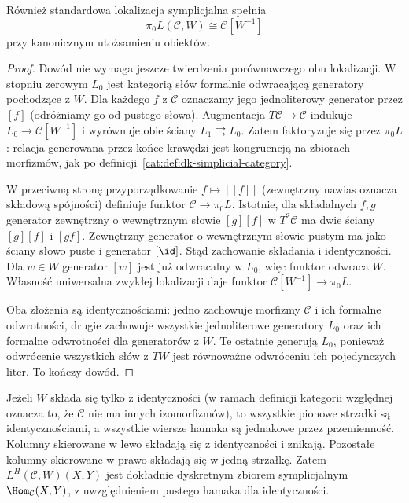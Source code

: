 \begin{wniosek}\label{cat:cor:dk-standard-pi0}
Również standardowa lokalizacja symplicjalna spełnia
\[
 \pi_0 L(\mathcal C,W)\cong\mathcal C[W^{-1}]
\]
przy kanonicznym utożsamieniu obiektów.
\end{wniosek}
\begin{proof}
Dowód nie wymaga jeszcze twierdzenia porównawczego obu lokalizacji. W stopniu zerowym $L_0$ jest kategorią słów formalnie odwracającą generatory pochodzące z $W$. Dla każdego $f$ z $\mathcal C$ oznaczamy jego jednoliterowy generator przez $[f]$ (odróżniamy go od pustego słowa). Augmentacja $T\mathcal C\to\mathcal C$ indukuje $L_0\to\mathcal C[W^{-1}]$ i wyrównuje obie ściany $L_1\rightrightarrows L_0$. Zatem faktoryzuje się przez $\pi_0 L$: relacja generowana przez końce krawędzi jest kongruencją na zbiorach morfizmów, jak po definicji~\ref{cat:def:dk-simplicial-category}.

W przeciwną stronę przyporządkowanie $f\mapsto[[f]]$ (zewnętrzny nawias oznacza składową spójności) definiuje funktor $\mathcal C\to\pi_0 L$. Istotnie, dla składalnych $f,g$ generator zewnętrzny o wewnętrznym słowie $[g][f]$ w $T^2\mathcal C$ ma dwie ściany $[g][f]$ i $[gf]$. Zewnętrzny generator o wewnętrznym słowie pustym ma jako ściany słowo puste i generator $[\id]$. Stąd zachowanie składania i identyczności. Dla $w\in W$ generator $[w]$ jest już odwracalny w $L_0$, więc funktor odwraca $W$. Własność uniwersalna zwykłej lokalizacji daje funktor $\mathcal C[W^{-1}]\to\pi_0 L$.

Oba złożenia są identycznościami: jedno zachowuje morfizmy $\mathcal C$ i ich formalne odwrotności, drugie zachowuje wszystkie jednoliterowe generatory $L_0$ oraz ich formalne odwrotności dla generatorów z $W$. Te ostatnie generują $L_0$, ponieważ odwrócenie wszystkich słów z $TW$ jest równoważne odwróceniu ich pojedynczych liter. To kończy dowód.
\end{proof}

\begin{przyklad}\label{cat:ex:dk-hammock-identities}
Jeżeli $W$ składa się tylko z identyczności (w ramach definicji kategorii względnej oznacza to, że $\mathcal C$ nie ma innych izomorfizmów), to wszystkie pionowe strzałki są identycznościami, a wszystkie wiersze hamaka są jednakowe przez przemienność. Kolumny skierowane w lewo składają się z identyczności i znikają. Pozostałe kolumny skierowane w prawo składają się w jedną strzałkę. Zatem $L^H(\mathcal C,W)(X,Y)$ jest dokładnie dyskretnym zbiorem symplicjalnym $\Hom_\mathcal C(X,Y)$, z uwzględnieniem pustego hamaka dla identyczności.
\end{przyklad}

